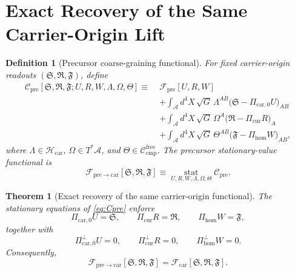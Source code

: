 \documentclass[11pt]{article}
\newcommand{\Sub}{\mathcal A}
\newcommand{\CompFree}{\mathscr C_{\mathrm{cmp}}^{\mathrm{free}}}
\newcommand{\CarrierFunctional}{\mathscr F_{\mathrm{car}}}
\newcommand{\PreFunctional}{\mathscr F_{\mathrm{pre}}}
\newcommand{\PreToCar}{\mathscr F_{\mathrm{pre}\to\mathrm{car}}}
\newcommand{\CarrierClass}{\mathscr H_{\mathrm{car}}}
\newcommand{\CarrierSeed}{\mathfrak S}
\newcommand{\RelabelSeed}{\mathfrak R}
\newcommand{\FreeSeed}{\mathfrak F}
\newcommand{\PreTensor}{U}
\newcommand{\PreRelabel}{R}
\newcommand{\PreFree}{W}
\newcommand{\PreCarProj}{\Pi_{\mathrm{car},0}}
\newcommand{\PreCarPerp}{\Pi_{\mathrm{car},0}^{\perp}}
\newcommand{\CurrentProj}{\Pi_{\mathrm{cur}}}
\newcommand{\CurrentPerp}{\Pi_{\mathrm{cur}}^{\perp}}
\newcommand{\FreeReadProj}{\Pi_{\mathrm{hom}}}
\newcommand{\FreeReadPerp}{\Pi_{\mathrm{hom}}^{\perp}}
\newcommand{\StrainMult}{\Lambda}
\newcommand{\NeutralMult}{\Omega}
\newcommand{\FreeMult}{\Theta}
\newtheorem{definition}{Definition}
\newtheorem{theorem}{Theorem}
\begin{document}
\section{Exact Recovery of the Same Carrier-Origin Lift}

\begin{definition}[Precursor coarse-graining functional]
\label{def:pre_cg}
For fixed carrier-origin readouts \((\CarrierSeed,\RelabelSeed,\FreeSeed)\), define
\begin{equation}
\begin{aligned}
\mathscr C_{\mathrm{pre}}
[\CarrierSeed,\RelabelSeed,\FreeSeed;\PreTensor,\PreRelabel,\PreFree,\StrainMult,\NeutralMult,\FreeMult]
\equiv\;
&\PreFunctional[\PreTensor,\PreRelabel,\PreFree]
\\
&+\int_{\Sub} d^4X\,\sqrt{G}\,
\StrainMult^{AB}\bigl(\CarrierSeed-\PreCarProj\PreTensor\bigr)_{AB}
\\
&+\int_{\Sub} d^4X\,\sqrt{G}\,
\NeutralMult^A\bigl(\RelabelSeed-\CurrentProj\PreRelabel\bigr)_A
\\
&+\int_{\Sub} d^4X\,\sqrt{G}\,
\FreeMult^{AB}\bigl(\FreeSeed-\FreeReadProj\PreFree\bigr)_{AB},
\end{aligned}
\label{eq:Cpre}
\end{equation}
where \(\StrainMult\in\CarrierClass\), \(\NeutralMult\in T^*\Sub\), and \(\FreeMult\in\CompFree\). The precursor stationary-value functional is
\begin{equation}
\PreToCar[\CarrierSeed,\RelabelSeed,\FreeSeed]
\equiv
\operatorname*{stat}_{\PreTensor,\PreRelabel,\PreFree,\StrainMult,\NeutralMult,\FreeMult}
\mathscr C_{\mathrm{pre}}.
\label{eq:Fprestat}
\end{equation}
\end{definition}

\begin{theorem}[Exact recovery of the same carrier-origin functional]
\label{thm:recover_car}
The stationary equations of \eqref{eq:Cpre} enforce
\begin{equation}
\PreCarProj\PreTensor=\CarrierSeed,
\qquad
\CurrentProj\PreRelabel=\RelabelSeed,
\qquad
\FreeReadProj\PreFree=\FreeSeed,
\label{eq:pre_constraints_1}
\end{equation}
together with
\begin{equation}
\PreCarPerp\PreTensor=0,
\qquad
\CurrentPerp\PreRelabel=0,
\qquad
\FreeReadPerp\PreFree=0.
\label{eq:pre_constraints_2}
\end{equation}
Consequently,
\begin{equation}
\PreToCar[\CarrierSeed,\RelabelSeed,\FreeSeed]
=
\CarrierFunctional[\CarrierSeed,\RelabelSeed,\FreeSeed].
\label{eq:car_exact}
\end{equation}
\end{theorem}
\end{document}
